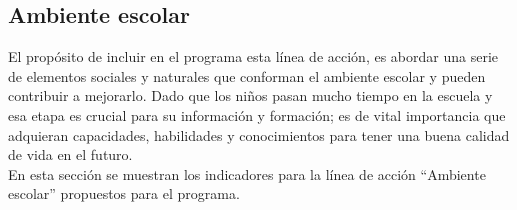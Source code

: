 
\subsection{Ambiente escolar}

El propósito de incluir en el programa esta línea de acción, es abordar una serie de elementos sociales y naturales que conforman el ambiente escolar y pueden contribuir a mejorarlo. 
Dado que los niños pasan mucho tiempo en la escuela y esa etapa es crucial para su información y formación; es de vital importancia que adquieran capacidades, habilidades y conocimientos para tener una buena calidad de vida en el futuro.\\

En esta sección se muestran los indicadores para la línea de acción ``Ambiente escolar'' propuestos para el programa.

